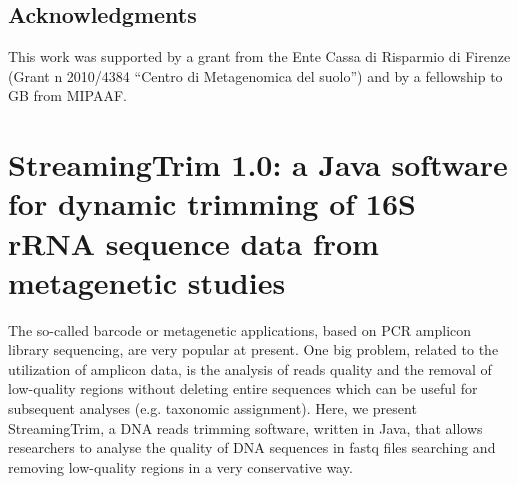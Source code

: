 \subsection{Acknowledgments}
This work was supported by a grant from the Ente Cassa di Risparmio di Firenze (Grant n{\textdegree} 2010/4384 ``Centro di Metagenomica del suolo'') and by a fellowship to GB from MIPAAF.

\section{StreamingTrim 1.0: a Java software for dynamic trimming of 16S rRNA sequence data from metagenetic studies}
The so-called barcode or metagenetic applications, based on PCR amplicon library sequencing, are very popular at present. One big problem, related to the utilization of amplicon data, is the analysis of reads quality and the removal of low-quality regions without deleting entire sequences which can be useful for subsequent analyses (e.g. taxonomic assignment). Here, we present StreamingTrim, a DNA reads trimming software, written in Java, that allows researchers to analyse the quality of DNA sequences in fastq files searching and removing low-quality regions in a very conservative way.\\
\newpage

\newpage

\backmatter
{}
\renewcommand{\sectionmark}[1]{\markright{#1}}
\sectionmark{Bibliography}
